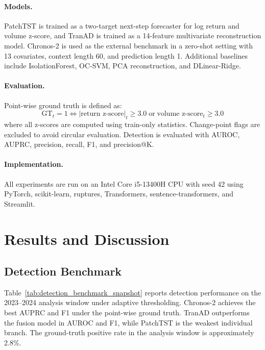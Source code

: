 \documentclass[11pt,a4paper,twoside]{article}
\begin{document}
\paragraph{Models.}
PatchTST is trained as a two-target next-step forecaster for log return and volume z-score, and TranAD is trained as a 14-feature multivariate reconstruction model. Chronos-2 is used as the external benchmark in a zero-shot setting with 13 covariates, context length 60, and prediction length 1. Additional baselines include IsolationForest, OC-SVM, PCA reconstruction, and DLinear-Ridge.

\paragraph{Evaluation.}
Point-wise ground truth is defined as:
\begin{equation}
\text{GT}_t = 1 \iff |\text{return z-score}|_t \geq 3.0 \;\text{or}\; \text{volume z-score}_t \geq 3.0
\end{equation}
where all z-scores are computed using train-only statistics. Change-point flags are excluded to avoid circular evaluation. Detection is evaluated with AUROC, AUPRC, precision, recall, F1, and precision@K.

\paragraph{Implementation.}
All experiments are run on an Intel Core i5-13400H CPU with seed 42 using PyTorch, scikit-learn, ruptures, Transformers, sentence-transformers, and Streamlit.

\section{Results and Discussion}

\subsection{Detection Benchmark}

Table~\ref{tab:detection_benchmark_snapshot} reports detection performance on the 2023–2024 analysis window under adaptive thresholding. Chronos-2 achieves the best AUPRC and F1 under the point-wise ground truth. TranAD outperforms the fusion model in AUROC and F1, while PatchTST is the weakest individual branch. The ground-truth positive rate in the analysis window is approximately 2.8\%.
\end{document}
